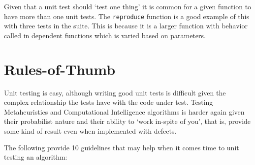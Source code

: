 \documentclass[a4paper, 11pt]{article}
\begin{document}
Given that a unit test should `test one thing' it is common for a given function to have more than one unit tests. The \texttt{reproduce} function is a good example of this with three tests in the suite. This is because it is a larger function with behavior called in dependent functions which is varied based on parameters.



%
%
\section{Rules-of-Thumb}
\label{sec:suggestions}
Unit testing is easy, although writing good unit tests is difficult given the complex relationship the tests have with the code under test. Testing Metaheuristics and Computational Intelligence algorithms is harder again given their probabilist nature and their ability to `work in-spite of you', that is, provide some kind of result even when implemented with defects.

The following provide 10 guidelines that may help when it comes time to unit testing an algorithm:
\end{document}
